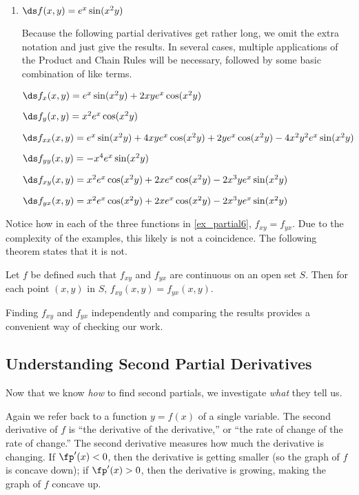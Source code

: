 {\begin{enumerate}
		$\ds f_{yx}(x,y) = \frac{\partial}{\px}\big(f_x\big) = \frac{\partial}{\px}\big(-\frac{2x^3}{y^3}\big) = 
-\frac{6x^2}{y^3}$	

\item	$\ds f(x,y) = e^x\sin(x^2y)$

  Because the following partial derivatives get rather long, we omit the extra notation and just give the results. In several cases, multiple applications of the Product and Chain Rules will be necessary, followed by some basic combination of like terms.
  
$\ds f_x(x,y) = e^x\sin(x^2y) + 2xye^x\cos(x^2y)$
	
	$\ds f_y(x,y) = x^2e^x\cos(x^2y)$
	
	$\ds f_{xx}(x,y) = e^x\sin(x^2y)+4xye^x\cos(x^2y)+2ye^x\cos(x^2y)-4x^2y^2e^x\sin(x^2y)$ 
	
	
		$\ds f_{yy}(x,y) =  -x^4e^x\sin(x^2y)$
		
		$\ds f_{xy}(x,y) = x^2e^x\cos(x^2y)+2xe^x\cos(x^2y)-2x^3ye^x\sin(x^2y)$
		
		$\ds f_{yx}(x,y) = x^2e^x\cos(x^2y)+2xe^x\cos(x^2y)-2x^3ye^x\sin(x^2y)$
	
\end{enumerate}}

Notice how in each of the three functions in \autoref{ex_partial6}, $f_{xy} = f_{yx}$. Due to the complexity of the examples, this likely is not a coincidence. The following theorem states that it is not.

{Let $f$ be defined such that $f_{xy}$ and $f_{yx}$ are continuous on an open set $S$. Then for each point $(x,y)$ in $S$, $f_{xy}(x,y) = f_{yx}(x,y)$.
}

Finding $f_{xy}$ and $f_{yx}$ independently and comparing the results provides a convenient way of checking our work.

\subsection*{Understanding Second Partial Derivatives}

Now that we know \textit{how} to find second partials, we investigate \textit{what} they tell us. 

Again we refer back to a function $y=f(x)$ of a single variable. The second derivative of $f$ is ``the derivative of the derivative,'' or ``the rate of change of the rate of change.'' The second derivative measures how much the derivative is changing. If $\fp'(x)<0$, then the derivative is getting smaller (so the graph of $f$ is concave down); if $\fp'(x)>0$, then the derivative is growing, making the graph of $f$ concave up. 

